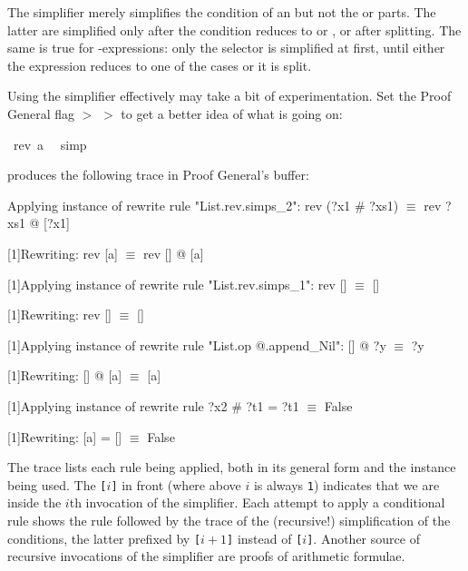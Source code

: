 \begin{isabellebody}
\begin{isamarkuptxt}
\begin{warn}
  The simplifier merely simplifies the condition of an 
   but not the
   or  parts. The latter are simplified only after the
  condition reduces to  or , or after splitting. The
  same is true for -expressions: only the selector is
  simplified at first, until either the expression reduces to one of the
  cases or it is split.
\end{warn}%
\end{isamarkuptxt}%
\isamarkuptrue%
%
\endisatagproof
{\isafoldproof}%
%
\isadelimproof
%
\endisadelimproof
%
\isamarkuptrue%
%
\begin{isamarkuptext}%
Using the simplifier effectively may take a bit of experimentation.  Set the
Proof General flag  $>$  $>$  to get a better idea of what is going on:%
\end{isamarkuptext}%
\isamarkuptrue%
\isamarkupfalse%
\ {\isachardoublequoteopen}rev\ {\isacharbrackleft}a{\isacharbrackright}\ {\isacharequal}\ {\isacharbrackleft}{\isacharbrackright}{\isachardoublequoteclose}\isanewline
%
\isadelimproof
%
\endisadelimproof
%
\isatagproof
{}\isamarkupfalse%
{\isacharparenleft}simp{\isacharparenright}%
\endisatagproof
{\isafoldproof}%
%
\isadelimproof
%
\endisadelimproof
%
\begin{isamarkuptext}%
\noindent
produces the following trace in Proof General's  buffer:

\begin{ttbox}\makeatother
[1]Applying instance of rewrite rule "List.rev.simps_2":
rev (?x1 # ?xs1) \(\equiv\) rev ?xs1 @ [?x1]

[1]Rewriting:
rev [a] \(\equiv\) rev [] @ [a]

[1]Applying instance of rewrite rule "List.rev.simps_1":
rev [] \(\equiv\) []

[1]Rewriting:
rev [] \(\equiv\) []

[1]Applying instance of rewrite rule "List.op @.append_Nil":
[] @ ?y \(\equiv\) ?y

[1]Rewriting:
[] @ [a] \(\equiv\) [a]

[1]Applying instance of rewrite rule
?x2 # ?t1 = ?t1 \(\equiv\) False

[1]Rewriting:
[a] = [] \(\equiv\) False
\end{ttbox}
The trace lists each rule being applied, both in its general form and
the instance being used. The \texttt{[}$i$\texttt{]} in front (where
above $i$ is always \texttt{1}) indicates that we are inside the $i$th
invocation of the simplifier. Each attempt to apply a
conditional rule shows the rule followed by the trace of the
(recursive!) simplification of the conditions, the latter prefixed by
\texttt{[}$i+1$\texttt{]} instead of \texttt{[}$i$\texttt{]}.
Another source of recursive invocations of the simplifier are
proofs of arithmetic formulae.


\end{isamarkuptext}
\end{isabellebody}
